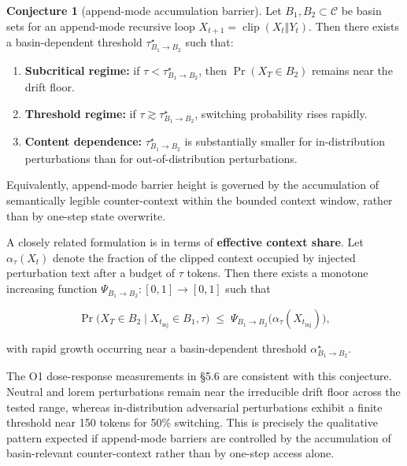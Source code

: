 \documentclass{article}
\theoremstyle{plain}
\theoremstyle{definition}
\newtheorem{conjecture}{Conjecture}
\begin{document}
\begin{conjecture}[append-mode accumulation barrier]
 Let
$B_1, B_2 \subset \mathcal{C}$ be basin sets for an append-mode
recursive loop $X_{t+1} = \operatorname{clip}(X_t \Vert Y_t)$. Then
there exists a basin-dependent threshold
$\tau^\star_{B_1 \to B_2}$ such that:

\begin{enumerate}
  \item \textbf{Subcritical regime:} if $\tau < \tau^\star_{B_1 \to B_2}$, then
   $\Pr(X_T \in B_2)$ remains near the drift floor.
  \item \textbf{Threshold regime:} if $\tau \gtrsim \tau^\star_{B_1 \to B_2}$,
   switching probability rises rapidly.
  \item \textbf{Content dependence:} $\tau^\star_{B_1 \to B_2}$ is substantially
   smaller for in-distribution perturbations than for out-of-distribution
   perturbations.
\end{enumerate}

Equivalently, append-mode barrier height is governed by the
accumulation of semantically legible counter-context within the
bounded context window, rather than by one-step state overwrite.

A closely related formulation is in terms of \textbf{effective context
share}. Let $\alpha_\tau(X_t)$ denote the fraction of the clipped
context occupied by injected perturbation text after a budget of
$\tau$ tokens. Then there exists a monotone increasing function
$\Psi_{B_1 \to B_2} : [0, 1] \to [0, 1]$ such that

\begin{equation*}
\Pr\bigl(X_T \in B_2 \mid X_{t_{\mathrm{inj}}} \in B_1, \tau\bigr)
\;\le\;
\Psi_{B_1 \to B_2}\bigl(\alpha_\tau(X_{t_{\mathrm{inj}}})\bigr),
\end{equation*}

with rapid growth occurring near a basin-dependent threshold
$\alpha^\star_{B_1 \to B_2}$.
\end{conjecture}

The O1 dose-response measurements in §5.6 are consistent with this
conjecture. Neutral and lorem perturbations remain near the
irreducible drift floor across the tested range, whereas
in-distribution adversarial perturbations exhibit a finite threshold
near 150 tokens for 50\% switching. This is precisely the qualitative
pattern expected if append-mode barriers are controlled by the
accumulation of basin-relevant counter-context rather than by
one-step access alone.
\end{document}
